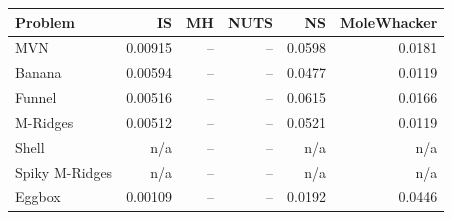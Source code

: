 \begin{tabular}{lrrrrr}
\toprule
Problem & IS & MH & NUTS & NS & MoleWhacker \\
\midrule
MVN & 0.00915 & -- & -- & 0.0598 & 0.0181 \\
Banana & 0.00594 & -- & -- & 0.0477 & 0.0119 \\
Funnel & 0.00516 & -- & -- & 0.0615 & 0.0166 \\
M-Ridges & 0.00512 & -- & -- & 0.0521 & 0.0119 \\
Shell & n/a & -- & -- & n/a & n/a \\
Spiky M-Ridges & n/a & -- & -- & n/a & n/a \\
\midrule
Eggbox & 0.00109 & -- & -- & 0.0192 & 0.0446 \\
\bottomrule
\end{tabular}
